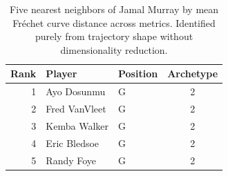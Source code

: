 \begin{table}[htbp]
  \centering\small
  \begin{tabular}{rllc}
    \toprule
    Rank & Player & Position & Archetype \\
    \midrule
    1 & Ayo Dosunmu & G & 2 \\
    2 & Fred VanVleet & G & 2 \\
    3 & Kemba Walker & G & 2 \\
    4 & Eric Bledsoe & G & 2 \\
    5 & Randy Foye & G & 2 \\
    \bottomrule
  \end{tabular}
  \caption{Five nearest neighbors of Jamal Murray by mean Fr\'{e}chet curve distance across metrics. Identified purely from trajectory shape without dimensionality reduction.}
  \label{tab:Jamal_Murray_frechet_curve_neighbors}
\end{table}

